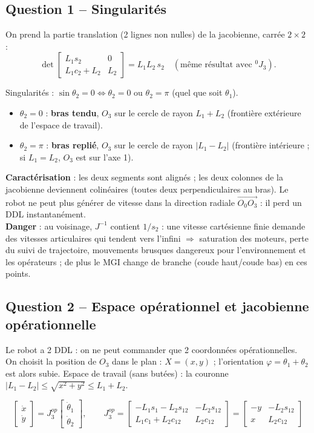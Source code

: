 \documentclass[11pt,a4paper]{article}
\newcommand{\dt}[1]{\dot\theta_{#1}}
\begin{document}
\subsection*{Question 1 -- Singularités}
On prend la partie translation (2 lignes non nulles) de la jacobienne, carrée $2\times2$ :
\[\det\begin{bmatrix}L_1s_2&0\\L_1c_2+L_2&L_2\end{bmatrix}=L_1L_2\,s_2\quad(\text{même résultat avec }{}^0J_3).\]
\begin{res}
Singularités : $\sin\theta_2=0\iff\theta_2=0$ ou $\theta_2=\pi$ (quel que soit $\theta_1$).
\end{res}
\begin{itemize}
\item $\theta_2=0$ : \textbf{bras tendu}, $O_3$ sur le cercle de rayon $L_1+L_2$ (frontière extérieure de l'espace de travail).
\item $\theta_2=\pi$ : \textbf{bras replié}, $O_3$ sur le cercle de rayon $|L_1-L_2|$ (frontière intérieure ; si $L_1=L_2$, $O_3$ est sur l'axe 1).
\end{itemize}
\textbf{Caractérisation} : les deux segments sont alignés ; les deux colonnes de la jacobienne deviennent colinéaires (toutes deux perpendiculaires au bras). Le robot ne peut plus générer de vitesse dans la direction radiale $\overrightarrow{O_0O_3}$ : il perd un DDL instantanément.\\
\textbf{Danger} : au voisinage, $J^{-1}$ contient $1/s_2$ : une vitesse cartésienne finie demande des vitesses articulaires qui tendent vers l'infini $\Rightarrow$ saturation des moteurs, perte du suivi de trajectoire, mouvements brusques dangereux pour l'environnement et les opérateurs ; de plus le MGI change de branche (coude haut/coude bas) en ces points.

\subsection*{Question 2 -- Espace opérationnel et jacobienne opérationnelle}
Le robot a 2 DDL : on ne peut commander que 2 coordonnées opérationnelles. On choisit la position de $O_3$ dans le plan : $X=(x,y)$ ; l'orientation $\varphi=\theta_1+\theta_2$ est alors subie.
Espace de travail (sans butées) : la couronne $|L_1-L_2|\le\sqrt{x^2+y^2}\le L_1+L_2$.
\begin{res}
\[\begin{bmatrix}\dot x\\\dot y\end{bmatrix}=J_3^{op}\begin{bmatrix}\dt1\\\dt2\end{bmatrix},\qquad
J_3^{op}=\begin{bmatrix}-L_1s_1-L_2s_{12}&-L_2s_{12}\\L_1c_1+L_2c_{12}&L_2c_{12}\end{bmatrix}=\begin{bmatrix}-y&-L_2s_{12}\\x&L_2c_{12}\end{bmatrix}\]
\end{res}
\end{document}
